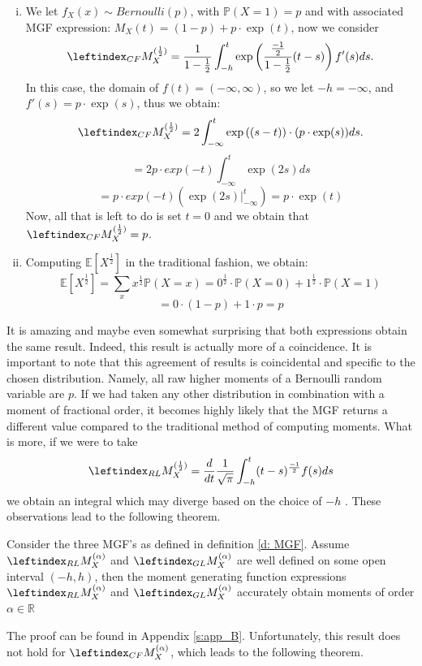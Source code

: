 \begin{example}
    \begin{enumerate}[(i)]
        \item We let \(f_X(x) \sim Bernoulli(p)\), with \(\mathbb{P}(X = 1) = p\) and with associated MGF expression: \(M_X(t) = (1 - p) + p \cdot\exp(t)\), now we consider \[\leftindex_{CF}{M}_X^{(\frac{1}{2})} = \frac{1}{1 - \frac{1}{2}}  \int_{-h}^{t} \exp\left(\frac{\frac{-1}{2}}{1 - \frac{1}{2}}(t-s)\right) f'(s) ds.\] In this case, the domain of \(f(t) = (-\infty, \infty)\), so we let \(-h = -\infty\), and \(f'(s) = p\cdot \exp(s)\), thus we obtain:
        \[\leftindex_{CF}{M}_X^{(\frac{1}{2})} = 2  \int_{-\infty}^{t} \exp\left((s-t)\right) \cdot (p\cdot \exp(s)) ds.\]
        \[= 2p \cdot exp(-t) \int_{-\infty}^{t}\exp(2s) ds\] 
        \[= p\cdot exp(-t) \left(\exp(2s) \Big|_{-\infty}^{t}\right) = p\cdot \exp(t)\]
        Now, all that is left to do is set \(t = 0\) and we obtain that \(\leftindex_{CF}{M}_X^{(\frac{1}{2})} = p\).
        \item Computing \(\mathbb{E}[{X^{\frac{1}{2}}}]\) in the traditional fashion, we obtain: 
        \[\mathbb{E}[{X^{\frac{1}{2}}}] = \sum_x x^{\frac{1}{2}} \mathbb{P}(X = x) = 0^{\frac{1}{2}} \cdot \mathbb{P}(X = 0) + 1^{\frac{1}{2}} \cdot \mathbb{P}(X = 1)\]
        \[ = 0 \cdot(1 - p) + 1 \cdot p = p\]
    \end{enumerate}
    
\end{example}
It is amazing and maybe even somewhat surprising that both expressions obtain the same result. Indeed, this result is actually more of a coincidence. It is important to note that this agreement of results is coincidental and specific to the chosen distribution. Namely, all raw higher moments of a Bernoulli random variable are \(p\). If we had taken any other distribution in combination with a moment of fractional order, it becomes highly likely that the MGF returns a different value compared to the traditional method of computing moments. What is more, if we were to take \[\leftindex_{RL}{M}_X^{(\frac{1}{2})}  = \frac{d}{dt} \frac{1}{\sqrt{\pi}}  \int_{-h}^{t} (t - s)^{\frac{-1}{2}} f(s) ds\] we obtain an integral which may diverge based on the choice of \(-h\) . These observations lead to the following theorem.

\begin{theorem}\label{t: MGF_accurate}
     Consider the three MGF's as defined in definition \ref{d: MGF}. Assume \(\leftindex_{RL}{M}_X^{(\alpha)}\) and \(\leftindex_{GL}{M}_X^{(\alpha)}\) are well defined on some open interval \((-h, h)\), then the moment generating function expressions \(\leftindex_{RL}{M}_X^{(\alpha)}\) and \(\leftindex_{GL}{M}_X^{(\alpha)}\) accurately obtain moments of order \(\alpha \in \mathbb{R}\)
    
\end{theorem}
The proof can be found in Appendix \ref{s:app_B}.
Unfortunately, this result does not hold for \(\leftindex_{CF}{M}_X^{(\alpha)}\), which leads to the following theorem.

